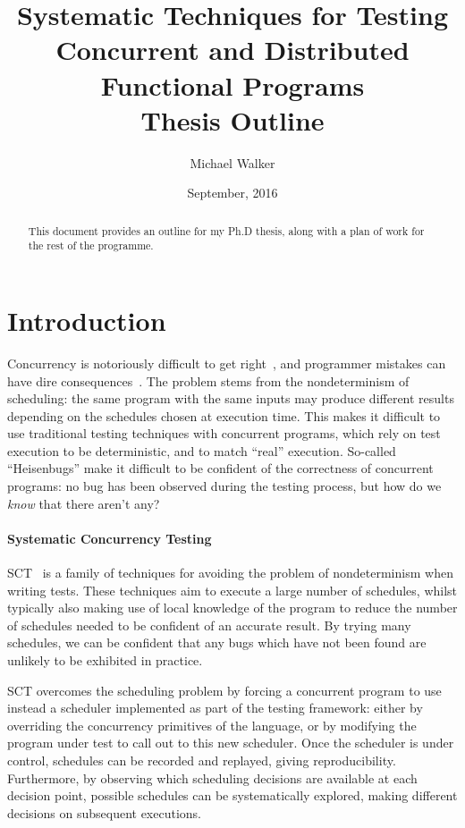 \documentclass{article}
\title{Systematic Techniques for Testing Concurrent and Distributed Functional Programs \\ \large Thesis Outline}
\author{Michael Walker}
\date{September, 2016}
\begin{document}
\maketitle

\begin{abstract}
  This document provides an outline for my Ph.D thesis, along with a
  plan of work for the rest of the programme.
\end{abstract}

\tableofcontents

\pagebreak

\section{Introduction}

Concurrency is notoriously difficult to get right~\cite{yang2013}, and
programmer mistakes can have dire consequences~\cite{leveson1993}. The
problem stems from the nondeterminism of scheduling: the same program
with the same inputs may produce different results depending on the
schedules chosen at execution time. This makes it difficult to use
traditional testing techniques with concurrent programs, which rely on
test execution to be deterministic, and to match ``real''
execution. So-called ``Heisenbugs'' make it difficult to be confident
of the correctness of concurrent programs: no bug has been observed
during the testing process, but how do we \emph{know} that there
aren't any?

\paragraph{Systematic Concurrency Testing}
SCT~\cite{emmi2011,musuvathi2007,musuvathi2008,thomson2014} is a
family of techniques for avoiding the problem of nondeterminism when
writing tests. These techniques aim to execute a large number of
schedules, whilst typically also making use of local knowledge of the
program to reduce the number of schedules needed to be confident of an
accurate result. By trying many schedules, we can be confident that
any bugs which have not been found are unlikely to be exhibited in
practice.

SCT overcomes the scheduling problem by forcing a concurrent program
to use instead a scheduler implemented as part of the testing
framework: either by overriding the concurrency primitives of the
language, or by modifying the program under test to call out to this
new scheduler. Once the scheduler is under control, schedules can be
recorded and replayed, giving reproducibility. Furthermore, by
observing which scheduling decisions are available at each decision
point, possible schedules can be systematically explored, making
different decisions on subsequent executions.
\end{document}
